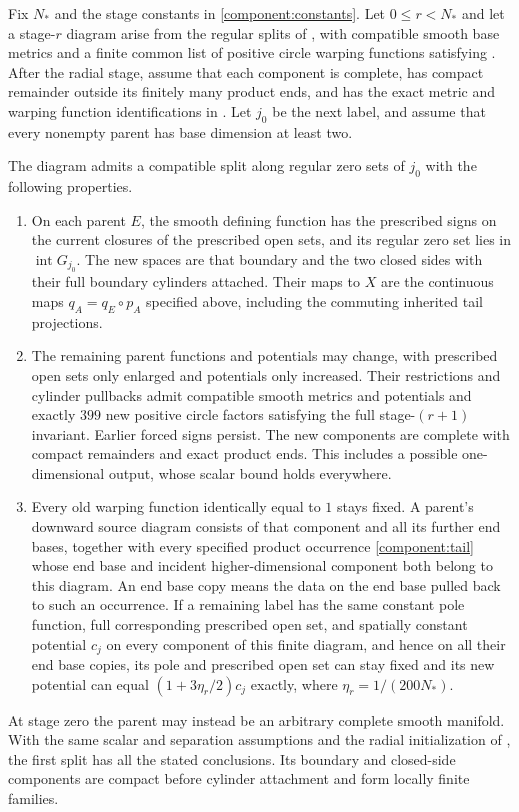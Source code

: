 \begin{theorem}\label{finite:cut}
Fix $N_*$ and the stage constants in \eqref{component:constants}. Let
$0\le r<N_*$ and let a stage-$r$ diagram arise from the regular
splits of , with compatible smooth base metrics
and a finite common list of positive circle warping functions satisfying
. After the radial stage, assume that each
component is complete, has compact remainder outside its finitely many
product ends, and has the exact metric and warping function identifications in
. Let $j_0$ be the next label, and assume that
every nonempty parent has base dimension at least two.

The diagram admits a compatible split along regular zero sets of $j_0$ with the
following properties.
\begin{enumerate}[label=(\roman*),leftmargin=*]
\item On each parent $E$, the smooth defining function has the
prescribed signs on the current closures of the prescribed open sets, and its regular
zero set lies in $\operatorname{int}G_{j_0}$. The new spaces are
that boundary and the two closed sides with their full boundary cylinders
attached. Their maps to $X$ are the continuous maps $q_A=q_E\circ p_A$
specified above, including the commuting inherited tail projections.
\item The remaining parent functions and potentials may change, with
prescribed open sets only enlarged and potentials only increased. Their restrictions
and cylinder pullbacks admit compatible smooth metrics and potentials
and exactly $399$ new positive circle factors satisfying the full
stage-$(r+1)$ invariant. Earlier forced signs persist. The new components
are complete with compact remainders and exact product ends. This
includes a possible one-dimensional output, whose scalar bound holds
everywhere.
\item Every old warping function identically equal to $1$ stays fixed. A parent's
downward source diagram consists of that component and all its further
end bases, together with every specified product occurrence
\eqref{component:tail} whose end base and incident higher-dimensional component both belong to this diagram.
An end base copy means the data on the end base pulled back to such an
occurrence. If a remaining label has the same constant pole function,
full corresponding prescribed open set, and spatially constant potential $c_j$ on
every component of this finite diagram, and hence on all their end base copies,
its pole and prescribed open set can stay fixed
and its new potential can equal $(1+3\eta_r/2)c_j$ exactly, where
$\eta_r=1/(200N_*)$.
\end{enumerate}
At stage zero the parent may instead be an arbitrary complete smooth
manifold. With the same scalar and separation assumptions and the
radial initialization of , the first split
has all the stated conclusions. Its boundary and closed-side components
are compact before cylinder attachment and form locally finite families.
\end{theorem}


